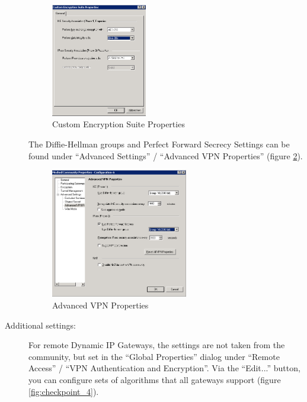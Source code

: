 \begin{description}
\begin{figure}[p]
  \centering
  \includegraphics[width=0.411\textwidth]{checkpoint_2.png}
  \caption{Custom Encryption Suite Properties}
  \label{fig:checkpoint_2}
\end{figure}

The Diffie-Hellman groups and Perfect Forward Secrecy Settings can be
found under ``Advanced Settings'' / ``Advanced VPN Properties''
(figure \ref{fig:checkpoint_3}).

\begin{figure}[p]
  \centering
  \includegraphics[width=0.589\textwidth]{checkpoint_3.png}
  \caption{Advanced VPN Properties}
  \label{fig:checkpoint_3}
\end{figure}

\item[Additional settings:] \mbox{}

For remote Dynamic IP Gateways, the settings are not taken from the
community, but set in the ``Global Properties'' dialog under ``Remote
Access'' / ``VPN Authentication and Encryption''. Via the ``Edit...''
button, you can configure sets of algorithms that all gateways support
(figure \ref{fig:checkpoint_4}).


\end{description}
